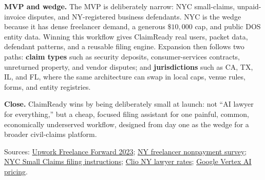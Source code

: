 \documentclass[11pt]{article}
\begin{document}
{\bfseries MVP and wedge.} The MVP is deliberately narrow: NYC small-claims, unpaid-invoice disputes, and NY-registered business defendants. NYC is the wedge because it has dense freelancer demand, a generous \(\$10{,}000\) cap, and public DOS entity data. Winning this workflow gives ClaimReady real users, packet data, defendant patterns, and a reusable filing engine. Expansion then follows two paths: \textbf{claim types} such as security deposits, consumer-services contracts, unreturned property, and vendor disputes; and \textbf{jurisdictions} such as CA, TX, IL, and FL, where the same architecture can swap in local caps, venue rules, forms, and entity registries.
\vspace{-1pt}

{\bfseries Close.} ClaimReady wins by being deliberately small at launch: not ``AI lawyer for everything,'' but a cheap, focused filing assistant for one painful, common, economically underserved workflow, designed from day one as the wedge for a broader civil-claims platform.

\vspace{1pt}
{\scriptsize
Sources: \href{https://www.upwork.com/press/releases/upwork-study-finds-64-million-americans-freelanced-in-2023-adding-1-27-trillion-to-u-s-economy}{Upwork Freelance Forward 2023};
\href{https://nwu.org/survey-shows-that-62-of-ny-freelancers-experience-non-payment-need-freelance-isnt-free-law-statewide/}{NY freelancer nonpayment survey};
\href{https://nycourts.gov/courts/nyc/smallclaims/forms/instructionsforfiling.pdf}{NYC Small Claims filing instructions};
\href{https://www.clio.com/resources/legal-trends/compare-lawyer-rates/ny/}{Clio NY lawyer rates};
\href{https://cloud.google.com/vertex-ai/generative-ai/pricing}{Google Vertex AI pricing}.}
\end{document}

